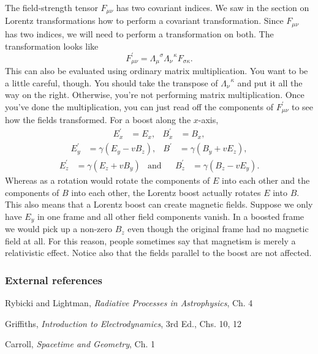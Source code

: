 \documentclass{article}
\begin{document}
The field-strength tensor $F_{\mu \nu}$ has two covariant indices. We saw in the section on Lorentz transformations how to perform a covariant transformation. Since $F_{\mu \nu}$ has two indices, we will need to perform a transformation on both. The transformation looks like \begin{equation} F^\prime_{\mu \nu} = \Lambda_{\mu}^{\,\,\,\, \sigma} \Lambda_{\nu}^{\,\,\,\, \kappa} F_{\sigma \kappa} . \end{equation} This can also be evaluated using ordinary matrix multiplication. You want to be a little careful, though. You should take the transpose of $\Lambda_\nu^{\,\,\,\, \kappa}$ and put it all the way on the right. Otherwise, you're not performing matrix multiplication. Once you've done the multiplication, you can just read off the components of $F^\prime_{\mu \nu}$ to see how the fields transformed. For a boost along the $x$-axis, \begin{align} E^\prime_x & = E_x , & B^\prime_x & = B_x , \end{align} \begin{align} E^\prime_y & = \gamma ( E_y - v B_z ) , & B^\prime & = \gamma ( B_y + v E_z ) , \end{align} \begin{align} E^\prime_z & = \gamma ( E_z + v B_y ) & \mathrm{and} & & B^\prime_z & = \gamma ( B_z - v E_y ) . \end{align} Whereas as a rotation would rotate the components of $E$ into each other and the components of $B$ into each other, the Lorentz boost actually rotates $E$ into $B$. This also means that a Lorentz boost can create magnetic fields. Suppose we only have $E_y$ in one frame and all other field components vanish. In a boosted frame we would pick up a non-zero $B_z$ even though the original frame had no magnetic field at all. For this reason, people sometimes say that magnetism is merely a relativistic effect. Notice also that the fields parallel to the boost are not affected.


\subsubsection*{External references}

Rybicki and Lightman, \emph{Radiative Processes in Astrophysics}, Ch. 4

Griffiths, \emph{Introduction to Electrodynamics}, 3rd Ed., Chs. 10, 12

Carroll, \emph{Spacetime and Geometry}, Ch. 1
\end{document}
